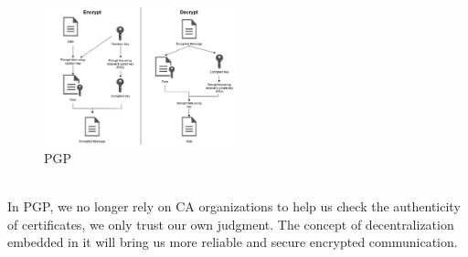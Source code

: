 \begin{figure}[H] %
    \centering %
    \includegraphics[width=0.5\textwidth]{figures/PGP.png} %
    \caption{PGP} %
    \label{Fig.6: PGP} %
    \end{figure}
\\
In PGP, we no longer rely on CA organizations to help us check the authenticity of 
certificates, we only trust our own judgment. The concept of decentralization embedded 
in it will bring us more reliable and secure encrypted communication\cite{b36}.